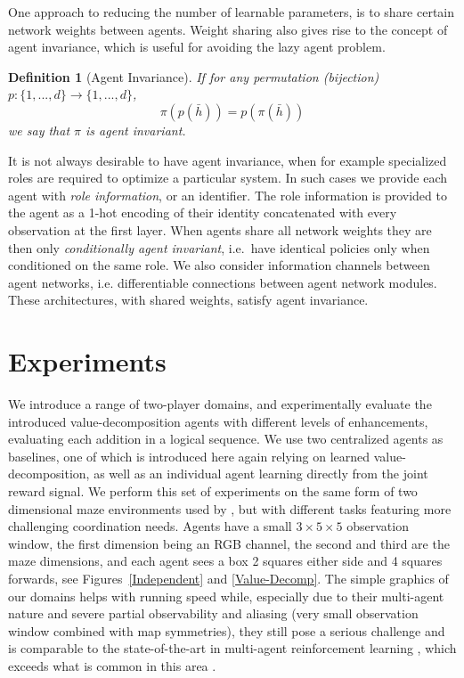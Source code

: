 \documentclass{article}
\newtheorem{definition}{Definition}
\begin{document}
\begin{SCfigure}
One approach to reducing the number of learnable parameters, is to share certain network weights between agents.
Weight sharing also gives rise to the concept of agent invariance, which is useful for avoiding the lazy agent problem.

\begin{definition}[Agent Invariance]
If for any permutation (bijection) $p:\{1,...,d\}\to\{1,...,d\}$, 
$$\pi(p(\bar{h}))=p(\pi(\bar{h}))$$
we say that $\pi$ is \emph{agent invariant}. 
\end{definition}

It is not always desirable to have agent invariance, when for example specialized roles are required to optimize a particular system. In such cases we provide each agent with \emph{role information}, or an identifier. The role information is provided to the agent as a 1-hot encoding of their identity concatenated with every observation at the first layer. When agents share all network weights they are then only \emph{conditionally agent invariant}, i.e.\ have identical policies only when conditioned on the same role. We also consider information channels between agent networks, i.e. differentiable connections between agent network modules. These architectures, with shared weights, satisfy agent invariance.

 
\section{Experiments} \label{ExperimentSection}
We introduce a range of two-player domains, and experimentally evaluate the introduced value-decomposition agents with different levels of enhancements, evaluating each addition in a logical sequence.  We use two centralized agents as baselines, one of which is introduced here again relying on learned value-decomposition, as well as an individual agent learning directly from the joint reward signal. We perform this set of experiments on the same form of two dimensional maze environments used by \citet{leibo2017}, but with different tasks featuring more challenging coordination needs. Agents have a small $3\times5\times5$ observation window, the first dimension being an RGB channel, the second and third are the maze dimensions, and each agent sees a box 2 squares either side and 4 squares forwards, see Figures~\ref{Independent} and \ref{Value-Decomp}. The simple graphics of our domains helps with running speed while, especially due to their multi-agent nature and severe partial observability and aliasing (very small observation window combined with map symmetries), they still pose a serious challenge and is comparable to the state-of-the-art in multi-agent reinforcement learning \citep{leibo2017}, which exceeds what is common in this area \citep{TuylsW12}.


\end{SCfigure}
\end{document}
